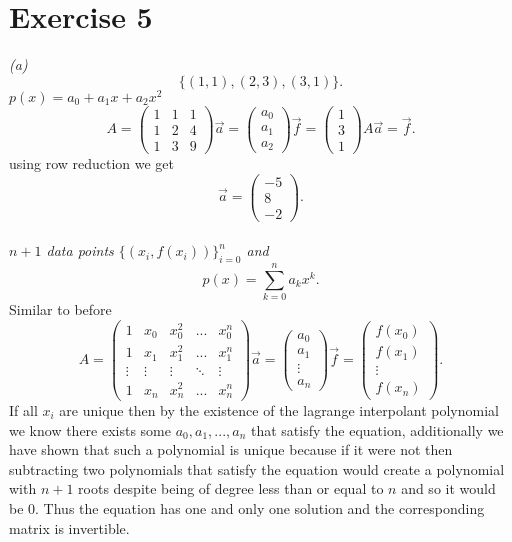 \documentclass{amsart}
\begin{document}
    \section{Exercise 5}
    \emph{
        (a) 
        \[
            \{(1,1),(2,3),(3,1)\}
        .\] 
        $p(x) = a_0 + a_1x + a_2x^2$
    }
    \[
    A = \begin{pmatrix} 
        1 & 1 & 1\\
        1 & 2 & 4\\
        1 & 3 & 9
    \end{pmatrix} 
    \vec{a} = \begin{pmatrix} a_0 \\ a_1 \\ a_2 \end{pmatrix} 
    \vec{f} = \begin{pmatrix} 1 \\ 3 \\ 1 \end{pmatrix} 
    A\vec{a} = \vec{f}
    .\] 
    using row reduction we get
    \[
    \vec{a} = \begin{pmatrix} -5 \\ 8 \\ -2 \end{pmatrix} 
    .\] 
    \\
    \emph{
        $n+1$ data points $\{(x_i,f(x_i))\}_{i=0}^{n}$ and
        \[
        p(x) = \sum_{k=0}^{n}a_kx^{k}
        .\] 
    }
    Similar to before
    \[
        A = \begin{pmatrix} 
            1 & x_0 & x_0^2 & ... & x_0^{n} \\
            1 & x_1 & x_1^2 & ... & x_1^{n}\\
            \vdots & \vdots & \vdots & \ddots & \vdots\\
            1 & x_n & x_n^2 & ... & x_n^{n}
        \end{pmatrix} 
        \vec{a} = \begin{pmatrix} a_0 \\ a_1 \\ \vdots \\ a_n \end{pmatrix} 
        \vec{f} = \begin{pmatrix} f(x_0) \\ f(x_1) \\ \vdots \\ f(x_n) \end{pmatrix} 
    .\] 
    If all $x_i$ are unique then by the existence of the lagrange interpolant polynomial we know there exists
    some $a_0,a_1,...,a_n$ that satisfy the equation, additionally we have shown that such a polynomial is unique because if it were not
    then subtracting two polynomials that satisfy the equation would create a polynomial with $n+1$ roots despite being of degree less than or equal
    to $n$ and so it would be 0. Thus the equation has one and only one solution and the corresponding matrix is invertible.
\end{document}
